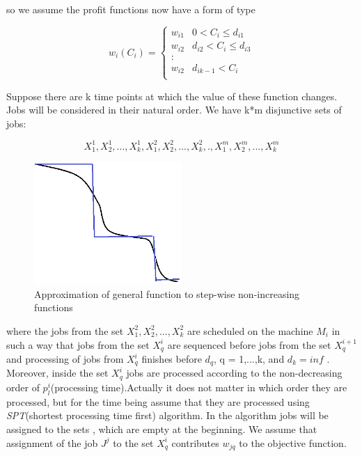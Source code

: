\documentclass[11pt, a4paper, notitlepage, oneside]{article}
\begin{document}
{so we assume the profit functions now have a form of type

$$
    w_i(C_i) = 
            \begin{cases} 
              w_{i1} & 0<C_i \leq d_{i1} \\
              w_{i2} & d_{i2}<C_i \leq d_{i3} \\
              : \\
              w_{i2} & d_{i k-1} < C_i  \\ 
            \end{cases}
$$

Suppose there are k time points at which the value of these function changes. Jobs will be considered in their natural order. We have k*m disjunctive sets of jobs:

$$
   X_1^1, X_2^1, ... , X_k^1, X_1^2, X_2^2, ... , X_k^2, .  , X_1^m, X_2^m, ... , X_k^m  
$$

\begin{figure}[!h]
\caption{Approximation of general function to step-wise non-increasing functions  }
\centering
\includegraphics[width=0.5\textwidth]{func}
\end{figure}

where the jobs from the set $ X_1^2, X_2^2, ... , X_k^2 $ are scheduled on the machine $M_i$ in such a way that jobs from the set $X_q^i$ are sequenced before jobs from the set $X_q^{i+1}$ and processing of jobs from $X_q^i$ finishes before $d_q$, q = 1,...,k, and $d_k=inf $ .
Moreover, inside the set $X_q^i$ jobs are processed according to the non-decreasing order of $p_l^i$(processing time).Actually it does not matter in which order they are processed, but for the time being assume that they are processed using \textit{SPT}(shortest processing time first) algorithm. In the algorithm jobs will be assigned to the sets , which are empty at the beginning. We assume that assignment of the job $J^j$ to the set $X_q^i$ contributes $w_{jq}$ to the objective function.

}
\end{document}
